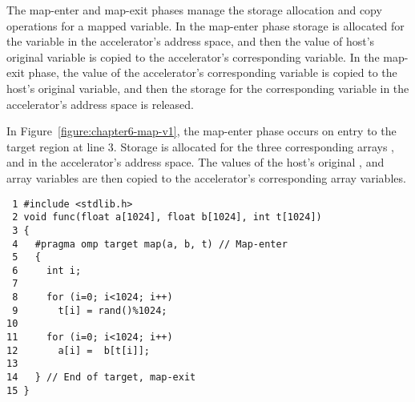The map-enter and map-exit phases manage the storage allocation and copy
operations for a mapped variable.
In the map-enter phase storage is allocated for the variable in the accelerator's
address space, and then the value of host's original variable is copied to the 
accelerator's corresponding variable.
In the map-exit phase, the value of the accelerator's corresponding variable 
is copied to the host's original variable, and then the storage for the 
corresponding variable in the accelerator's address space is released.
    
%
%
%

In Figure~\ref{figure:chapter6-map-v1}, the map-enter phase occurs on entry to
the target region at line $3$.  Storage is allocated for the three
corresponding arrays ,  and  in the accelerator's address space.  The
values of the host's original ,  and  array variables are then copied
to the accelerator's corresponding array variables. 

\begin{figure*}[!b]
\begin{verbatim}
 1 #include <stdlib.h>
 2 void func(float a[1024], float b[1024], int t[1024])
 3 {
 4   #pragma omp target map(a, b, t) // Map-enter
 5   {
 6     int i;
 7 
 8     for (i=0; i<1024; i++)
 9       t[i] = rand()%1024;
10 
11     for (i=0; i<1024; i++)
12       a[i] =  b[t[i]];
13 
14   } // End of target, map-exit
15 }
\end{verbatim}
\caption{ \textbf {Example of the map clause} -- \small
          Copies occur for the arrays \texttt{a}, \texttt{b}, and 
          \texttt{t} at the entry to and exit from the target region.
         }
\label{figure:chapter6-map-v1}
\end{figure*}

